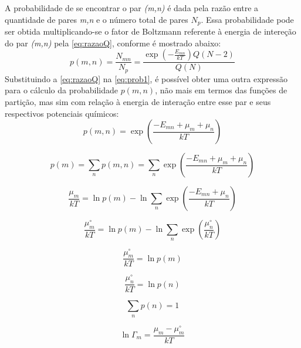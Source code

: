 \documentclass[3p]{elsarticle}
\begin{document}
A probabilidade de se encontrar o par \emph{(m,n)} é dada pela razão entre a
quantidade de pares \emph{m,n} e o número total de pares $N_p$. Essa
probabilidade pode ser obtida multiplicando-se o fator de Boltzmann referente à
energia de intereção do par \emph{(m,n)} pela \autoref{eq:razaoQ}, conforme é
mostrado abaixo:
\begin{equation}\label{eq:prob1}
p(m,n) = \frac{N_{mn}}{N_p} =
\displaystyle\frac{\exp\left(-\displaystyle\frac{E_{mn}}{kT}\right)Q(N-2)}{Q(N)}
\end{equation}
Substituindo a \autoref{eq:razaoQ} na \autoref{eq:prob1},  é possível obter uma
outra expressão para o cálculo da probabilidade $p(m,n)$, não mais em termos
das funções de partição, mas sim com relação à energia de interação entre esse
par e seus respectivos potenciais químicos:
\begin{equation}
p(m,n) = \exp\left(\displaystyle\frac{-E_{mn}+\mu_m+\mu_n}{kT}\right)
\end{equation}

\begin{equation}
p(m) = \displaystyle\sum_np(m,n) =
\displaystyle\sum_n\exp\left(\displaystyle\frac{-E_{mn}+\mu_m+\mu_n}{kT}\right)
\end{equation}

\begin{equation}
\frac{\mu_m}{kT} = \ln p(m) -
\ln\displaystyle\sum_n\exp\left(\displaystyle\frac{-E_{mn}+\mu_n}{kT}\right)
\end{equation}

\begin{equation}
\frac{\mu_m^{\circ}}{kT} = \ln p(m) -
\ln\displaystyle\sum_n\exp\left(\displaystyle\frac{\mu_n^{\circ}}{kT}\right)
\end{equation}

\begin{equation}
\frac{\mu_m^{\circ}}{kT} = \ln p(m)
\end{equation}

\begin{equation}
\frac{\mu_n^{\circ}}{kT} = \ln p(n)
\end{equation}

\begin{equation}
\displaystyle\sum_np(n)=1
\end{equation}

\begin{equation}
\ln\Gamma_m = \frac{\mu_m - \mu_m^{\circ}}{kT}
\end{equation}
\end{document}
